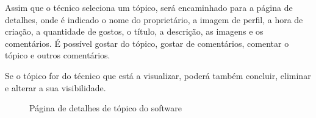 Assim que o técnico seleciona um tópico, será encaminhado para a página de detalhes, onde é indicado o nome do proprietário, a imagem de perfil, a hora de criação, a quantidade de gostos, o título, a descrição, as imagens e os comentários. É possível gostar do tópico, gostar de comentários, comentar o tópico e outros comentários.

Se o tópico for do técnico que está a visualizar, poderá também concluir, eliminar e alterar a sua visibilidade.

\begin{figure}[htb]%
    \centering
    \qquad
    \caption{Página de detalhes de tópico do software}%
    \label{fig:27}%
\end{figure}

